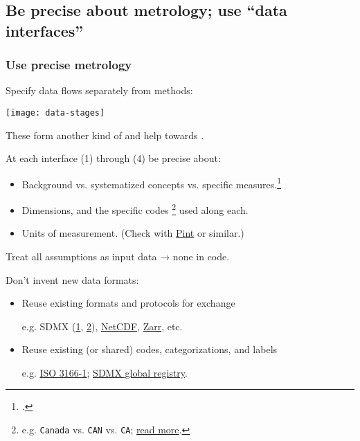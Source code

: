 \documentclass[12pt,aspectratio=169]{beamer}
\begin{document}
\subsection{Be precise about metrology; use “data interfaces”}
\begin{frame}[allowframebreaks]
\frametitle{Use precise metrology}

Specify data flows separately from methods:
\smallskip

\texttt{[image: data-stages]}

These form another kind of  and help towards .

\framebreak

At each interface (1) through (4) be precise about:
\begin{itemize}
  \item Background vs. systematized concepts vs. specific measures.\footcite{adcock-collier-2001}
  \item Dimensions, and the specific codes%
    \footnote{e.g. \texttt{Canada} vs. \texttt{CAN} vs. \texttt{CA}; \href{https://paul.kishimoto.name/2021/01/handling-country-codes/}{read more}.}
    used along each.
  \item Units of measurement. (Check with \href{https://pint.readthedocs.io}{Pint} or similar.)
\end{itemize}

\medskip
Treat all assumptions as input data → none in code.

\medskip
Don't invent new data formats:
\begin{itemize}
  \item Reuse existing formats and protocols for exchange

    e.g. SDMX (\href{https://sdmx.org}{1}, \href{https://sdmx1.readthedocs.io/en/latest}{2}), \href{https://www.unidata.ucar.edu/software/netcdf/}{NetCDF}, \href{https://zarr.readthedocs.io/en/stable/}{Zarr}, etc.
  \item Reuse existing (or shared) codes, categorizations, and labels

    e.g. \href{https://en.wikipedia.org/wiki/List_of_ISO_3166_country_codes}{ISO 3166-1}; \href{https://registry.sdmx.org/items/codelist.html}{SDMX global registry}.
\end{itemize}

\end{frame}
\end{document}
